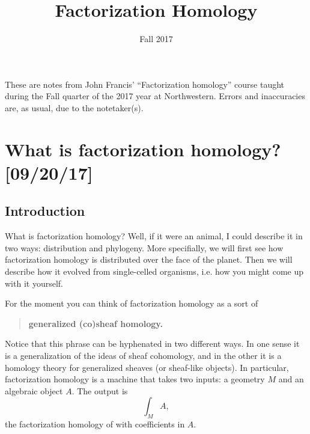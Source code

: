 \documentclass{amsart}
\title{Factorization Homology}
\author{}
\date{Fall 2017}
\begin{document}
\maketitle
\tableofcontents

These are notes from John Francis' ``Factorization homology'' course 
taught during the Fall quarter of the 2017 year at Northwestern. 
Errors and inaccuracies are, as usual, due to the notetaker(s).


\section{What is factorization homology? [09/20/17]}

\subsection{Introduction}

What is factorization homology? Well, if it were an animal, I could describe it in two ways:
distribution and phylogeny. More specifially, we will first see how factorization
homology is distributed over the face of the planet.
Then we will describe how it evolved from single-celled organisms, i.e. how you
might come up with it yourself.

For the moment you can think of factorization homology as a sort of 
\begin{quote}
    \textbf{generalized (co)sheaf homology.}
\end{quote}
Notice that this phrase can be hyphenated in two different ways. In one sense it is a
generalization of the ideas of sheaf cohomology, and in the other it is a homology theory
for generalized sheaves (or sheaf-like objects).
In particular, factorization homology is a machine that takes two inputs:
a geometry $M$ and an algebraic object $A$. The output is
\begin{equation*}
    \int_M A,
\end{equation*}
the factorization homology of with coefficients in $A$.
\end{document}
